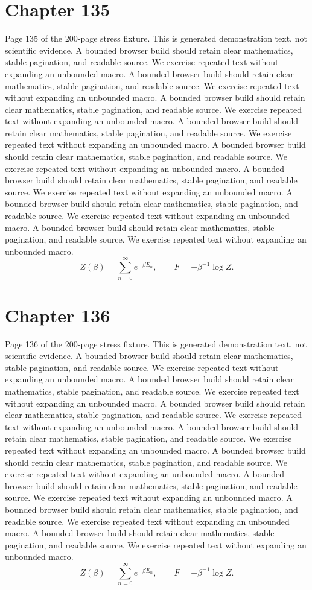 \documentclass[11pt]{article}
\begin{document}
\section*{Chapter 135}
Page 135 of the 200-page stress fixture. This is generated demonstration text, not scientific evidence.
A bounded browser build should retain clear mathematics, stable pagination, and readable source. We exercise repeated text without expanding an unbounded macro.
A bounded browser build should retain clear mathematics, stable pagination, and readable source. We exercise repeated text without expanding an unbounded macro.
A bounded browser build should retain clear mathematics, stable pagination, and readable source. We exercise repeated text without expanding an unbounded macro.
A bounded browser build should retain clear mathematics, stable pagination, and readable source. We exercise repeated text without expanding an unbounded macro.
A bounded browser build should retain clear mathematics, stable pagination, and readable source. We exercise repeated text without expanding an unbounded macro.
A bounded browser build should retain clear mathematics, stable pagination, and readable source. We exercise repeated text without expanding an unbounded macro.
A bounded browser build should retain clear mathematics, stable pagination, and readable source. We exercise repeated text without expanding an unbounded macro.
A bounded browser build should retain clear mathematics, stable pagination, and readable source. We exercise repeated text without expanding an unbounded macro.
\[Z(\beta)=\sum_{n=0}^{\infty}e^{-\beta E_n},\qquad F=-\beta^{-1}\log Z.\]
\newpage
\section*{Chapter 136}
Page 136 of the 200-page stress fixture. This is generated demonstration text, not scientific evidence.
A bounded browser build should retain clear mathematics, stable pagination, and readable source. We exercise repeated text without expanding an unbounded macro.
A bounded browser build should retain clear mathematics, stable pagination, and readable source. We exercise repeated text without expanding an unbounded macro.
A bounded browser build should retain clear mathematics, stable pagination, and readable source. We exercise repeated text without expanding an unbounded macro.
A bounded browser build should retain clear mathematics, stable pagination, and readable source. We exercise repeated text without expanding an unbounded macro.
A bounded browser build should retain clear mathematics, stable pagination, and readable source. We exercise repeated text without expanding an unbounded macro.
A bounded browser build should retain clear mathematics, stable pagination, and readable source. We exercise repeated text without expanding an unbounded macro.
A bounded browser build should retain clear mathematics, stable pagination, and readable source. We exercise repeated text without expanding an unbounded macro.
A bounded browser build should retain clear mathematics, stable pagination, and readable source. We exercise repeated text without expanding an unbounded macro.
\[Z(\beta)=\sum_{n=0}^{\infty}e^{-\beta E_n},\qquad F=-\beta^{-1}\log Z.\]
\newpage
\end{document}
